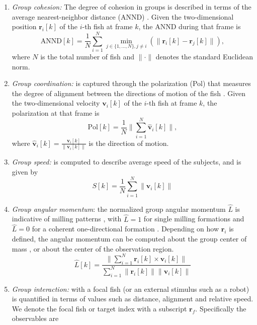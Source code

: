 \documentclass[11pt]{article}
\def\bs{\boldsymbol}
\newcommand{\norm}[1]{\lVert#1\rVert}
\begin{document}
\begin{enumerate}
\item \emph{Group cohesion:} The degree of cohesion in groups is described in terms of the average nearest-neighbor distance (ANND) \cite{Webster2007, Kolpas2008}. Given the two-dimensional position $\bs{r}_i[k]$ of the $i$-th fish at frame $k$, the ANND during that frame is \cite{Kolpas2008}
\begin{equation}
\mathrm{ANND}[k]=\frac{1}{N}\sum_{i=1}^N\min_{j\in \{1,\ldots,N\}, j\ne i}(\norm{\bs{r}_i[k]-\bs{r}_j[k]}),
\end{equation}
where $N$ is the total number of fish and $\norm{\cdot}$ denotes the standard Euclidean norm. 
\item \emph{Group coordination:} is captured through the polarization (Pol) that measures the degree of alignment between the directions of motion of the fish \cite{Vicsek1995}. Given the two-dimensional velocity $\bs{v}_i[k]$ of the $i$-th fish at frame $k$, the polarization at that frame is
\begin{equation}
\mathrm{Pol}[k]=\frac{1}{N}\Big\|\sum_{i=1}^N\hat{\bs{v}}_i[k]\Big\|, 
\end{equation} 
where $\hat{\bs{v}}_i[k] =\frac{\bs{v}_i[k]}{\norm{\bs{v}_i[k]}}$ is the direction of motion. 
\item \emph{Group speed:} is computed to describe average speed of the subjects, and is  given by 
\begin{equation}
S[k]=\frac{1}{N}\sum_{i=1}^N\|\bs{v}_i[k]\|
\end{equation}
\item \emph{Group angular momentum}: the normalized group angular momentum $\hat{L}$ is indicative of milling patterns \cite{Chuang2007, Couzin2003a}, with $\hat{L}=1$ for single milling formations and  $\hat{L}=0$ for a coherent one-directional formation \cite{Chuang2007}. Depending on how $\bs{r}_i$ is defined, the angular momentum can be computed about the group center of mass \cite{Aureli2012}, or about the center of the observation region.
\begin{equation}
\hat{L}[k]=\frac{\|\sum_{i=1}^N\bs{r}_i[k]\times\bs{v}_i[k]\|}{\sum_{i=1}^N\|\bs{r}_i[k]\|\|\bs{v}_i[k]\|}
\end{equation}
\item \emph{Group interaction:} with a focal fish (or an external stimulus such as a robot) is quantified in terms of values such as distance, alignment and relative speed. We denote the focal fish or target index with a subscript $\bs{r}_f$. Specifically the observables are

\end{enumerate}
\end{document}
